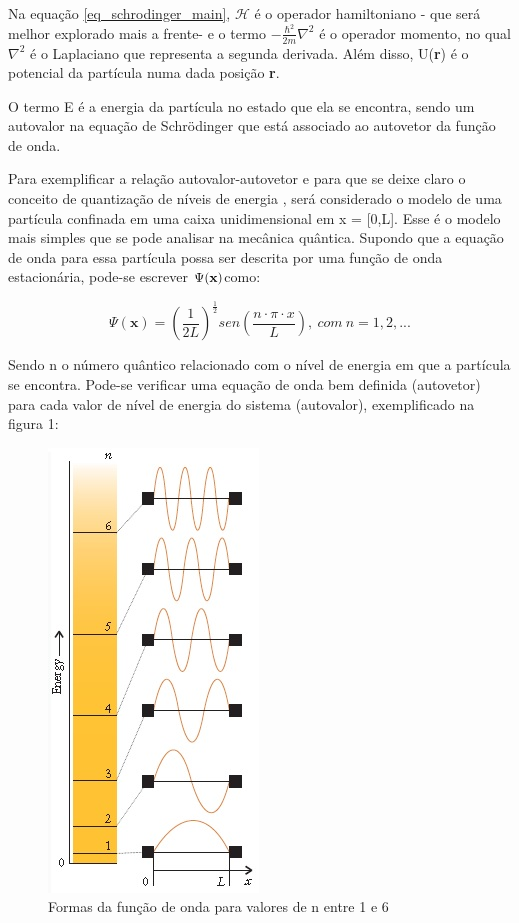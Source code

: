 \documentclass[11pt]{article}
\numberwithin{equation}{section}
\begin{document}
    \par Na equação \eqref{eq_schrodinger_main}, $\mathcal{H}$ é o operador hamiltoniano - que será melhor explorado mais a frente- e o termo $ -\frac{\hbar^2}{2m}\nabla^2 $ é o operador momento, no qual $\nabla^2$ é o Laplaciano que representa a segunda derivada. Além disso, U(\textbf{r}) é o potencial da partícula numa dada posição \textbf{r}.

    \par O termo E é a energia da partícula no estado que ela se encontra, sendo um autovalor na equação de Schrödinger que está associado ao autovetor da função de onda.

    \par Para exemplificar a relação autovalor-autovetor e para que se deixe claro o conceito de quantização de níveis de energia , será considerado o modelo de uma partícula confinada em uma caixa unidimensional em x = [0,L]. Esse é o modelo mais simples que se pode analisar na mecânica quântica. Supondo que a equação de onda para essa partícula possa ser descrita por uma função de onda estacionária, pode-se escrever $\Psi (\textbf x)$como:

    \begin{equation}\label{eq_schrodinger_eq1}
      \Psi(\mathbf{x}) = \left(\frac{1}{2L}\right)^\frac{1}{2} sen\left(\frac{n \cdot \pi \cdot x}{L}\right),\ com\ n = 1, 2, ...
    \end{equation}

    \par Sendo n o número quântico relacionado com o nível de energia em que a partícula se encontra. Pode-se verificar uma equação de onda bem definida (autovetor) para cada valor de nível de energia do sistema (autovalor), exemplificado na figura 1:

    \begin{figure}[h!]\label{fig1}
      \caption{Formas da função de onda para valores de n entre 1 e 6}
      \centering
      \includegraphics{images/figura1.png}
    \end{figure}
\end{document}
